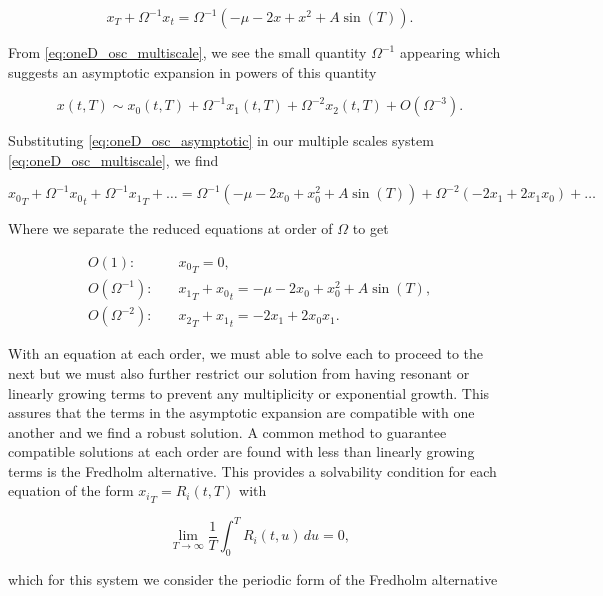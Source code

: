 \begin{equation}\label{eq:oneD_osc_multiscale}
x_T+\Omega^{-1}x_t=\Omega^{-1}\left(-\mu-2x+x^2+A\sin(T)\right).
\end{equation}

From \eqref{eq:oneD_osc_multiscale}, we see the small quantity $\Omega^{-1}$ appearing which suggests an asymptotic expansion in powers of this quantity

\begin{equation}\label{eq:oneD_osc_asymptotic}
x(t,T)\sim x_0(t,T)+\Omega^{-1}x_1(t,T)+\Omega^{-2}x_2(t,T)+O(\Omega^{-3}).
\end{equation}

Substituting \eqref{eq:oneD_osc_asymptotic} in our multiple scales system \eqref{eq:oneD_osc_multiscale}, we find

\begin{equation*}
{x_0}_T+\Omega^{-1}{x_0}_t+\Omega^{-1}{x_1}_T+\ldots=\Omega^{-1}(-\mu-2x_0+x_0^2+A\sin(T))+\Omega^{-2}(-2x_1+2x_1x_0)+\ldots
\end{equation*}

Where we separate the reduced equations at order of $\Omega$ to get

\begin{align}
\label{eq:oneD_osc_outerO1}
O(1):& \quad {x_0}_T=0, \\
\label{eq:oneD_osc_outerO2}
O(\Omega^{-1}):& \quad {x_1}_T+{x_0}_t =-\mu-2x_0+x_0^2+A\sin(T),\\
\label{eq:oneD_osc_outerO3}
O(\Omega^{-2}):& \quad {x_2}_T + {x_1}_t= -2x_1+2x_0 x_1.
\end{align}

With an equation at each order, we must able to solve each to proceed to the next but we must also further restrict our solution from having resonant or linearly growing terms to prevent any multiplicity or exponential growth. This assures that the terms in the asymptotic expansion are compatible with one another and we find a robust solution. A common method to guarantee compatible solutions at each order are found with less than linearly growing terms is the Fredholm alternative. This provides a solvability condition for each equation of the form ${x_i}_T=R_i(t,T)$ with

\begin{equation*}
\lim\limits_{T\to\infty}\frac{1}{T}\int_0^T R_i(t,u)\,du=0,
\end{equation*}

which for this system we consider the periodic form of the Fredholm alternative

